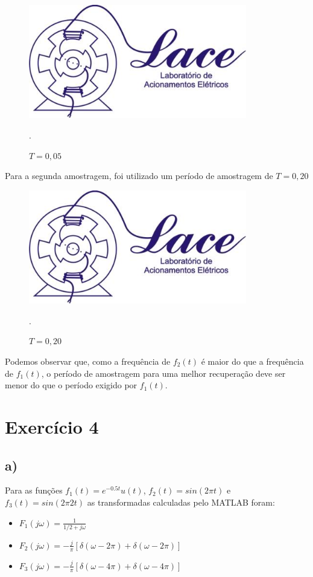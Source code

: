 \documentclass{article}[a4paper,12pt,twoside]
\begin{document}
\begin{figure}[H]
    \centering
    \includegraphics[width=0.85\textwidth]{a}
    \caption{$T = 0,05$}.
    \label{fig:my_label}
\end{figure}

Para a segunda amostragem, foi utilizado um período de amostragem de $T = 0,20$

\begin{figure}[H]
    \centering
    \includegraphics[width=0.85\textwidth]{a}
    \caption{$T = 0,20$}.
    \label{fig:my_label}
\end{figure}

Podemos observar que, como a frequência de $f_2(t)$ é maior do que a frequência de $f_1(t)$, o período de amostragem para uma melhor recuperação deve ser menor do que o período exigido por $f_1(t)$.

\section{Exercício 4}
\subsection{a)}
Para as funções $f_1(t)=e^{-0.5t}u(t)$, $f_2(t)=sin(2\pi t)$ e $f_3(t)=sin(2\pi2t)$ as transformadas calculadas pelo MATLAB foram:
\begin{itemize}
    \item $F_1(j\omega)=\frac{1}{1/2 + j\omega}$
    \item $F_2(j\omega)=-\frac{j}{\pi}[\delta(\omega-2\pi)+\delta(\omega-2\pi)]$
    \item $F_3(j\omega)=-\frac{j}{\pi}[\delta(\omega-4\pi)+\delta(\omega-4\pi)]$
\end{itemize}
\end{document}
